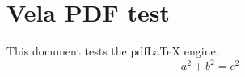 \documentclass{article}
\begin{document}
\section{Vela PDF test}
This document tests the pdfLaTeX engine.
\[ a^2+b^2=c^2 \]
\end{document}

